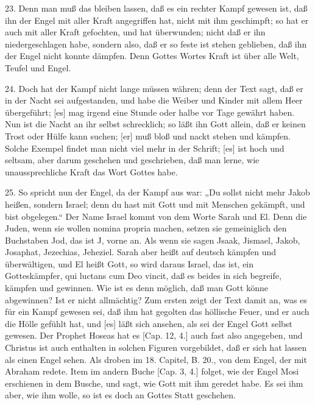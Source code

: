 23. Denn man muß das bleiben lassen, daß es ein rechter Kampf gewesen ist, daß ihn der Engel mit aller Kraft angegriffen hat, nicht mit ihm geschimpft; so hat er auch mit aller Kraft gefochten, und hat überwunden; nicht daß er ihn niedergeschlagen habe, sondern also, daß er so feste ist stehen geblieben, daß ihn der Engel nicht konnte dämpfen. Denn Gottes Wortes Kraft ist über alle Welt, Teufel und Engel.

24. Doch hat der Kampf nicht lange müssen währen; denn der Text sagt, daß er in der Nacht sei aufgestanden, und habe die Weiber und Kinder mit allem Heer übergeführt; [es] mag irgend eine Stunde oder halbe vor Tage gewährt haben. Nun ist die Nacht an ihr selbst schrecklich; so läßt ihn Gott allein, daß er keinen Trost oder Hülfe kann suchen; [er] muß bloß und nackt stehen und kämpfen. Solche Exempel findet man nicht viel mehr in der Schrift; [es] ist hoch und seltsam, aber darum geschehen und geschrieben, daß man lerne, wie unaussprechliche Kraft das Wort Gottes habe.

25. So spricht nun der Engel, da der Kampf aus war: „Du sollst nicht mehr Jakob heißen, sondern Israel; denn du hast mit Gott und mit Menschen gekämpft, und bist obgelegen.“ Der Name Israel kommt von dem Worte Sarah und El. Denn die Juden, wenn sie wollen nomina propria machen, setzen sie gemeiniglich den Buchstaben Jod, das ist J, vorne an. Als wenn sie sagen Jsaak, Jismael, Jakob, Josaphat, Jezechias, Jeheziel. Sarah aber heißt auf deutsch kämpfen und überwältigen, und El heißt Gott, so wird daraus Israel, das ist, ein Gotteskämpfer, qui luctans cum Deo vincit, daß es beides in sich begreife, kämpfen und gewinnen. Wie ist es denn möglich, daß man Gott könne abgewinnen? Ist er nicht allmächtig? Zum ersten zeigt der Text damit an, was es für ein Kampf gewesen sei, daß ihm hat gegolten das höllische Feuer, und er auch die Hölle gefühlt hat, und [es] läßt sich ansehen, als sei der Engel Gott selbst gewesen. Der Prophet Hoseas hat es [Cap. 12, 4.] auch fast also angegeben, und Christus ist auch enthalten in solchen Figuren vorgebildet, daß er sich hat lassen als einen Engel sehen. Als droben im 18. Capitel, B. 20., von dem Engel, der mit Abraham redete. Item im andern Buche [Cap. 3, 4.] folget, wie der Engel Mosi erschienen in dem Busche, und sagt, wie Gott mit ihm geredet habe. Es sei ihm aber, wie ihm wolle, so ist es doch an Gottes Statt geschehen.

